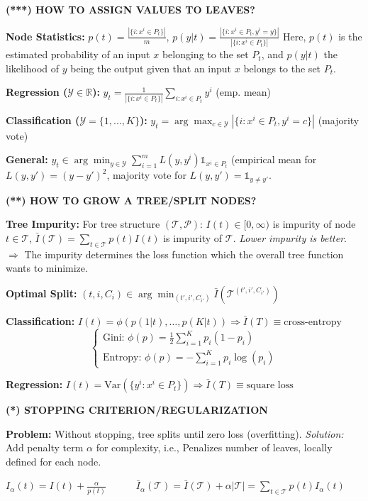 \documentclass[a4paper,10pt]{article}
\def\R{\mathbb{R}}
\newcommand{\subtitle}[1]{\vspace{0.25cm}\begin{normalsize}\textbf{\textcolor{gray!150}{\uppercase{#1}}}\end{normalsize}}
\begin{document}
\begin{small}
\newpage
\subtitle{(***) How to assign values to leaves?}

\textbf{Node Statistics:} $p(t) = \frac{|\{i: x^i \in P_t\}|}{m}$, $p(y|t) = \frac{|\{i: x^i \in P_t, y^i = y\}|}{|\{i: x^i \in P_t\}|}$ Here, $p(t)$ is the estimated probability of an input $x$ belonging to the set $P_t$, and $p(y | t)$ the likelihood of $y$ being the output given that an input $x$ belongs to the set $P_t$. 

\textbf{Regression ($\mathcal{Y} \in \R$):} $y_t = \frac{1}{|\{i: x^i \in P_t\}|}\sum_{i: x^i \in P_t} y^i$ (emp. mean)

\textbf{Classification ($\mathcal{Y} = \{1,...,K \}$):} $y_t = \arg\max_{c \in \mathcal{Y}} |\{i: x^i \in P_t, y^i = c\}|$ (majority vote)

\textbf{General:} $y_t \in \arg\min_{y \in \mathcal{Y}} \sum_{i=1}^m L(y,y^i) \mathds{1}_{x^i \in P_t}$ (empirical mean for $L(y, y')=(y-y')^2$, majority vote for $L(y, y')=\mathds{1}_{y \neq y'}$.


\subtitle{(**) How to grow a tree/split nodes?}

\textbf{Tree Impurity:} For tree structure $(\mathcal{T}, \mathcal{P})$: 
$I(t) \in [0,\infty)$ is impurity of node $t \in \mathcal{T}$, $\bar{I}(\mathcal{T}) = \sum_{t \in \mathcal{T}} p(t)I(t)$ is impurity of $\mathcal{T}$. \textit{Lower impurity is better}. $\Rightarrow$ The impurity determines the loss function which the overall tree function wants to minimize.

\textbf{Optimal Split:} $(t,i,C_i) \in \arg\min_{(t',i',C_{i'})} \bar{I}(\mathcal{T}^{(t',i',C_{i'})})$


\textbf{Classification:} $I(t) = \phi(p(1|t),\ldots,p(K|t)) \Rightarrow \bar{I}(T) \equiv \text{cross-entropy}$
    $$\begin{cases}
    \text{Gini: } \phi(p) = \frac{1}{2}\sum_{i=1}^K p_i(1-p_i) \\
    \text{Entropy: } \phi(p) = -\sum_{i=1}^K p_i\log(p_i)
    \end{cases}$$

\textbf{Regression:} $I(t) = \text{Var}(\{y^i: x^i \in P_t\}) \Rightarrow \bar{I}(T) \equiv \text{square loss}$

\subtitle{(*) Stopping criterion/regularization}
\textbf{Problem:} Without stopping, tree splits until zero loss (overfitting). \textit{Solution:} Add penalty term $\alpha$ for complexity, i.e., Penalizes number of leaves, locally defined for each node.

$I_\alpha(t) = I(t) + \frac{\alpha}{p(t)} \quad \quad \quad 
\bar{I}_\alpha(\mathcal{T}) = \bar{I}(\mathcal{T}) + \alpha|\mathcal{T}| = \sum_{t \in \mathcal{T}}p(t)I_\alpha(t)$



\end{small}
\end{document}

